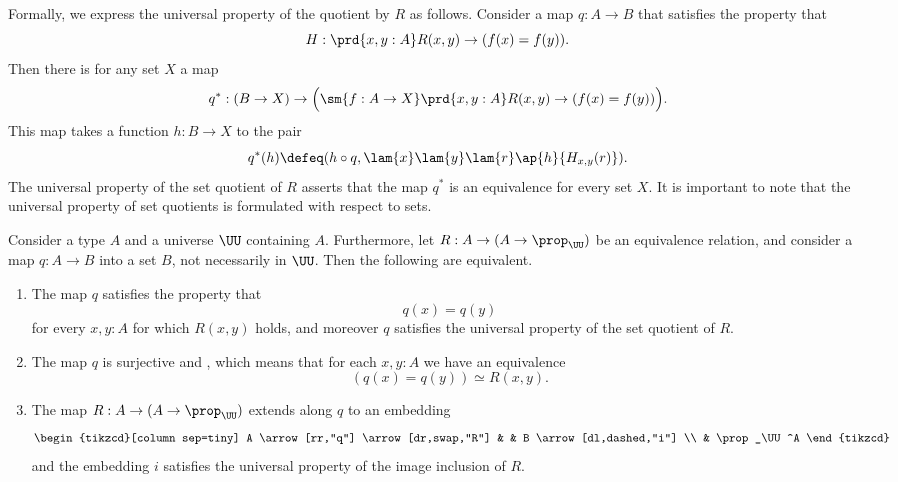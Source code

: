 \begin{rmk}
  Formally, we express the universal property of the quotient by $R$ as follows. Consider a map $q:A\to B$ that satisfies the property that
  \begin{equation*}
    H:\prd{x,y:A}R(x,y)\to (f(x)=f(y)).
  \end{equation*}
  Then there is for any set $X$ a map
  \begin{equation*}
    q^\ast:(B\to X) \to \Big(\sm{f:A\to X}\prd{x,y:A}R(x,y)\to (f(x)=f(y))\Big).
  \end{equation*}
  This map takes a function $h:B\to X$ to the pair
  \begin{equation*}
    q^\ast(h)\defeq(h\circ q,\lam{x}\lam{y}\lam{r}\ap{h}{H_{x,y}(r)}).
  \end{equation*}
  The universal property of the set quotient of $R$ asserts that the map $q^\ast$ is an equivalence for every set $X$. It is important to note that the universal property of set quotients is formulated with respect to sets.
\end{rmk}

\begin{thm}\label{thm:quotient_up}
  Consider a type $A$ and a universe $\UU$ containing $A$. Furthermore, let $R:A\to (A\to \prop_\UU)$ be an equivalence relation, and consider a map $q:A\to B$ into a set $B$, not necessarily in $\UU$. Then the following are equivalent.
  \begin{enumerate}
  \item \label{item:thm-quotient-up}The map $q$ satisfies the property that
    \begin{equation*}
      q(x)=q(y)
    \end{equation*}
    for every $x,y:A$ for which $R(x,y)$ holds, and moreover $q$ satisfies the universal property of the set quotient of $R$.
  \item \label{item:thm-quotient-effective}The map $q$ is surjective and , which means that for each $x,y:A$ we have an equivalence
    \begin{equation*}
      (q(x)=q(y))\simeq R(x,y).
    \end{equation*}
  \item \label{item:thm-quotient-up-image}The map $R:A\to (A\to \prop_\UU)$ extends along $q$ to an embedding
    \begin{equation*}
      \begin{tikzcd}[column sep=tiny]
        A \arrow[rr,"q"] \arrow[dr,swap,"R"] & & B \arrow[dl,dashed,"i"] \\
        & \prop_\UU^A
      \end{tikzcd}
    \end{equation*}
    and the embedding $i$ satisfies the universal property of the image inclusion of $R$.
  \end{enumerate}
\end{thm}

